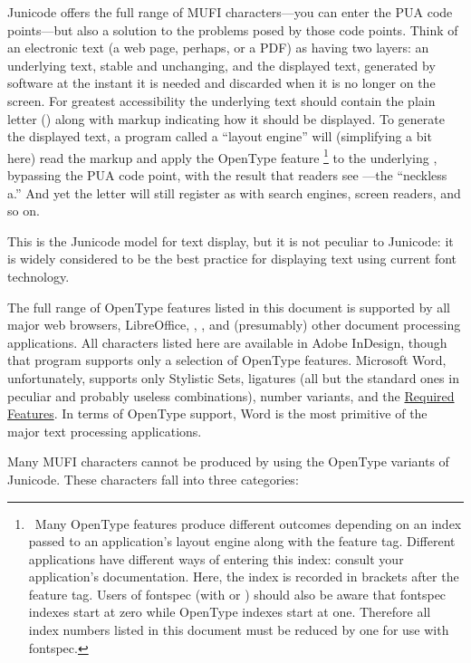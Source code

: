 Junicode offers the full range of MUFI characters—you can enter the PUA code points—but also a solution to the
problems posed by those code points. Think of an electronic text (a web page, perhaps, or a PDF) as having two layers:
an underlying text, stable and unchanging, and the displayed text, generated by software at the instant it is needed
and discarded when it is no longer on the screen. For greatest accessibility the underlying text should contain the
plain letter  () along with markup indicating how it should be displayed. To generate
the displayed text, a program called a “layout engine” will (simplifying a bit here) read the markup and apply the
OpenType feature \footnote{\ Many OpenType features produce different outcomes depending on
an index passed to an application’s layout engine along with the feature tag. Different applications have different
ways of entering this index: consult your application’s documentation. Here, the index is recorded in brackets after
the feature tag. Users of fontspec (with {\XeLaTeX} or {\LuaTeX}) should also be aware that fontspec indexes start at zero
while OpenType indexes start at one. Therefore all index numbers listed in this document must be reduced by one for
use with fontspec.\par } to the underlying , bypassing the PUA code point, with the result that
readers see —the “neckless a.” And yet the letter will still register as
 with search engines, screen readers, and so on.

This is the Junicode model for text display, but it is not peculiar to Junicode: it is widely considered to be the best
practice for displaying text using current font technology.

The full range of OpenType features listed in this document is supported by all major web browsers, LibreOffice, {\XeTeX},
{\LuaTeX}, and (presumably) other document processing applications. All characters listed here are available in Adobe
InDesign, though that program supports only a selection of OpenType features. Microsoft Word, unfortunately, supports
only Stylistic Sets, ligatures (all but the standard ones in peculiar and probably useless combinations), number
variants, and the \hyperlink{req}{Required Features}. In terms of
OpenType support, Word is the most primitive of the major text processing applications.

Many MUFI characters cannot be produced by using the OpenType variants of Junicode. These characters fall into three
categories:

